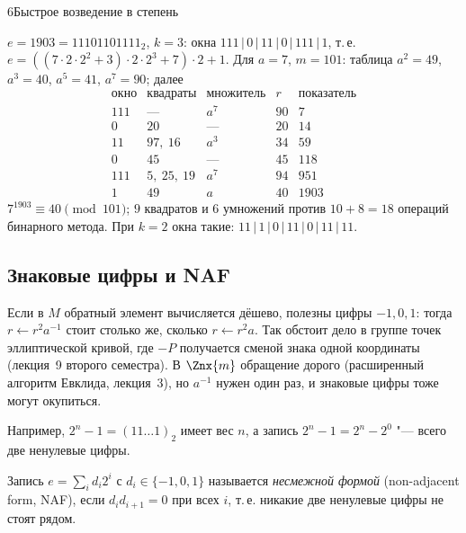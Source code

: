 \begin{lecture}{6}{Быстрое возведение в степень}
\begin{example}\label{l6:ex-sliding}
$e = 1903 = 11101101111_2$, $k = 3$: окна $111\,|\,0\,|\,11\,|\,0\,|\,111\,|\,1$, т.\,е.
$e = ((7 \cdot 2 \cdot 2^2 + 3) \cdot 2 \cdot 2^3 + 7) \cdot 2 + 1$. Для $a = 7$, $m = 101$:
таблица $a^2 = 49$, $a^3 = 40$, $a^5 = 41$, $a^7 = 90$; далее
\[
\begin{array}{c|l|c|r|r}
  \text{окно} & \text{квадраты} & \text{множитель} & r & \text{показатель} \\ \hline
  111 & \text{---} & a^7 & 90 & 7 \\
  0 & 20 & \text{---} & 20 & 14 \\
  11 & 97,\ 16 & a^3 & 34 & 59 \\
  0 & 45 & \text{---} & 45 & 118 \\
  111 & 5,\ 25,\ 19 & a^7 & 94 & 951 \\
  1 & 49 & a & 40 & 1903
\end{array}
\]
$7^{1903} \equiv 40 \pmod{101}$; $9$ квадратов и $6$ умножений против $10 + 8 = 18$ операций
бинарного метода. При $k = 2$ окна такие: $11\,|\,1\,|\,0\,|\,11\,|\,0\,|\,11\,|\,11$.
\end{example}



\subsection{Знаковые цифры и NAF}\label{l6:sec-naf}

Если в $M$ обратный элемент вычисляется дёшево, полезны цифры $-1, 0, 1$: тогда
$r \gets r^2 a^{-1}$ стоит столько же, сколько $r \gets r^2 a$. Так обстоит дело в группе точек
эллиптической кривой, где $-P$ получается сменой знака одной координаты (лекция~9 второго семестра).
В $\Znx{m}$ обращение дорого (расширенный алгоритм Евклида, лекция~3), но $a^{-1}$ нужен один раз,
и знаковые цифры тоже могут окупиться.

Например, $2^n - 1 = (11\dots1)_2$ имеет вес $n$, а запись $2^n - 1 = 2^n - 2^0$ "--- всего две
ненулевые цифры.

\begin{definition}
Запись $e = \sum_{i} d_i 2^i$ с $d_i \in \{-1, 0, 1\}$ называется \emph{несмежной формой}
(non-adjacent form, NAF), если $d_i d_{i+1} = 0$ при всех $i$, т.\,е. никакие две ненулевые
цифры не стоят рядом.
\end{definition}


\end{lecture}
